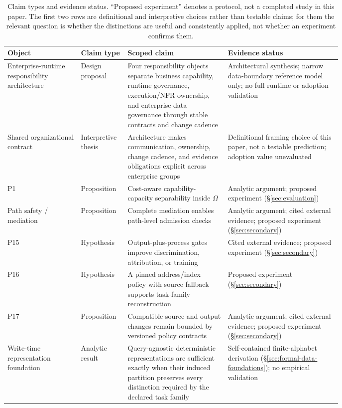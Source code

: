 \begin{table}[t]
\centering
\caption{Claim types and evidence status. ``Proposed experiment'' denotes a protocol, not a completed study in this paper. The first two rows are definitional and interpretive choices rather than testable claims; for them the relevant question is whether the distinctions are useful and consistently applied, not whether an experiment confirms them.}
\label{tab:propositions}
\begin{tabular}{lp{0.14\linewidth}p{0.30\linewidth}p{0.34\linewidth}}
\hline
Object & Claim type & Scoped claim & Evidence status \\
\hline
Enterprise-runtime responsibility architecture & Design proposal & Four responsibility objects separate business capability, runtime governance, execution/NFR ownership, and enterprise data governance through stable contracts and change cadence & Architectural synthesis; narrow data-boundary reference model only; no full runtime or adoption validation \\
Shared organizational contract & Interpretive thesis & Architecture makes communication, ownership, change cadence, and evidence obligations explicit across enterprise groups & Definitional framing choice of this paper, not a testable prediction; adoption value unevaluated \\
P1 & Proposition & Cost-aware capability-capacity separability inside $\Omega$ & Analytic argument; proposed experiment (\S\ref{sec:evaluation}) \\
Path safety / mediation & Proposition & Complete mediation enables path-level admission checks & Analytic argument; cited external evidence; proposed experiment (\S\ref{sec:secondary}) \\
P15 & Hypothesis & Output-plus-process gates improve discrimination, attribution, or training & Cited external evidence; proposed experiment (\S\ref{sec:secondary}) \\
P16 & Hypothesis & A pinned address/index policy with source fallback supports task-family reconstruction & Proposed experiment (\S\ref{sec:secondary}) \\
P17 & Proposition & Compatible source and output changes remain bounded by versioned policy contracts & Analytic argument; cited external evidence; proposed experiment (\S\ref{sec:secondary}) \\
Write-time representation foundation & Analytic result & Query-agnostic deterministic representations are sufficient exactly when their induced partition preserves every distinction required by the declared task family & Self-contained finite-alphabet derivation (\S\ref{sec:formal-data-foundations}); no empirical validation \\

\end{tabular}
\end{table}
